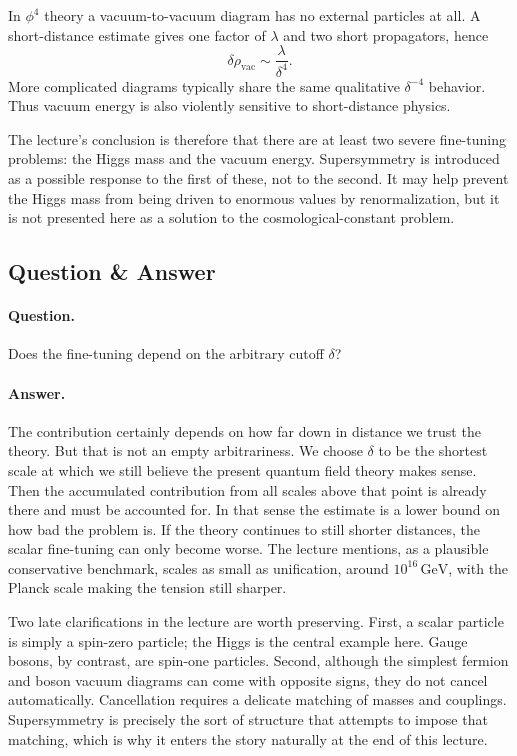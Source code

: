 In \(\phi^4\) theory a vacuum-to-vacuum diagram has no external particles at all. A short-distance estimate gives one factor of \(\lambda\) and two short propagators, hence
\begin{equation}
\delta\rho_{\mathrm{vac}}\sim \frac{\lambda}{\delta^4}.
\end{equation}
More complicated diagrams typically share the same qualitative \(\delta^{-4}\) behavior. Thus vacuum energy is also violently sensitive to short-distance physics.

The lecture's conclusion is therefore that there are at least two severe fine-tuning problems: the Higgs mass and the vacuum energy. Supersymmetry is introduced as a possible response to the first of these, not to the second. It may help prevent the Higgs mass from being driven to enormous values by renormalization, but it is not presented here as a solution to the cosmological-constant problem.

\subsection{Question \& Answer}

\paragraph{Question.} Does the fine-tuning depend on the arbitrary cutoff \(\delta\)?

\paragraph{Answer.} The contribution certainly depends on how far down in distance we trust the theory. But that is not an empty arbitrariness. We choose \(\delta\) to be the shortest scale at which we still believe the present quantum field theory makes sense. Then the accumulated contribution from all scales above that point is already there and must be accounted for. In that sense the estimate is a lower bound on how bad the problem is. If the theory continues to still shorter distances, the scalar fine-tuning can only become worse. The lecture mentions, as a plausible conservative benchmark, scales as small as unification, around \(10^{16}\,\mathrm{GeV}\), with the Planck scale making the tension still sharper.

Two late clarifications in the lecture are worth preserving. First, a scalar particle is simply a spin-zero particle; the Higgs is the central example here. Gauge bosons, by contrast, are spin-one particles. Second, although the simplest fermion and boson vacuum diagrams can come with opposite signs, they do not cancel automatically. Cancellation requires a delicate matching of masses and couplings. Supersymmetry is precisely the sort of structure that attempts to impose that matching, which is why it enters the story naturally at the end of this lecture.

